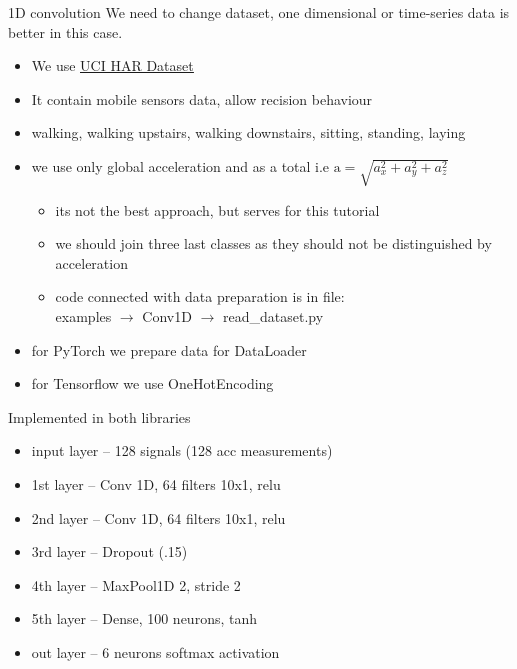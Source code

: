 \documentclass{beamer}%
\theoremstyle{definition}
\theoremstyle{definition}
\theoremstyle{example}
\theoremstyle{example}
\begin{document}
\begin{frame}{1D convolution}
We need to change dataset, one dimensional or time-series data is better in this case.
\begin{itemize}
\item We use \href{https://archive.ics.uci.edu/ml/datasets/human+activity+recognition+using+smartphones}{\color{blue}\underline{UCI HAR Dataset}}
\item It contain mobile sensors data, allow recision behaviour
\item walking, walking upstairs, walking downstairs, sitting, standing, laying
\item we use only global acceleration and as a total i.e $\text{a}=\sqrt{a_x^2+a_y^2+a_z^2}$
\begin{itemize}
  \item its not the best approach, but serves for this tutorial
  \item we should join three last classes as they should not be distinguished by acceleration
  \item code connected with data preparation is in file:\\ examples $\rightarrow$ Conv1D $\rightarrow$ read\_dataset.py
\end{itemize}
\item for PyTorch we prepare data for DataLoader
\item for Tensorflow we use OneHotEncoding
\end{itemize}
\end{frame}
\begin{frame}
Implemented in both libraries
\begin{itemize}
  \item input layer -- 128 signals (128 acc measurements)
  \item 1st layer -- Conv 1D, 64 filters 10x1, relu
  \item 2nd layer -- Conv 1D, 64 filters 10x1, relu
  \item 3rd layer -- Dropout (.15)
  \item 4th layer -- MaxPool1D 2, stride 2
  \item 5th layer -- Dense, 100 neurons, tanh
  \item out layer -- 6 neurons softmax activation
\end{itemize}
\end{frame}
\end{document}
